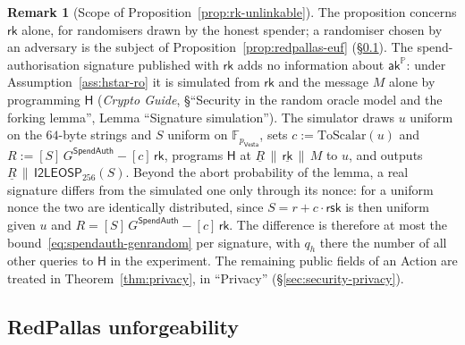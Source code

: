 \documentclass[11pt,a4paper]{article}
\theoremstyle{definition}
\newtheorem{remark}[theorem]{Remark}
\newcommand{\F}{\mathbb{F}}
\newcommand{\PP}{\mathbb{P}}
\newcommand{\rk}{\mathsf{rk}}
\newcommand{\Vesta}{\ensuremath{\mathsf{Vesta}}}
\newcommand{\aksym}{\ensuremath{\mathsf{ak}}}
\newcommand{\rsk}{\ensuremath{\mathsf{rsk}}}
\begin{document}
\begin{remark}[Scope of Proposition~\ref{prop:rk-unlinkable}]
The proposition concerns $\rk$ alone, for randomisers drawn by the honest
spender; a randomiser chosen by an adversary is the subject of
Proposition~\ref{prop:redpallas-euf} (\S\ref{sec:spendauth-euf}). The
spend-authorisation signature published with $\rk$ adds no information about
$\aksym^{\PP}$: under Assumption~\ref{ass:hstar-ro} it is simulated from
$\rk$ and the message $M$ alone by programming $\mathsf{H}$ (\emph{Crypto
Guide}, \S``Security in the random oracle model and the forking lemma'',
Lemma ``Signature simulation''). The simulator draws $u$ uniform on the
$64$-byte strings and $S$ uniform on $\F_{p_{\Vesta}}$, sets
$c := \mathrm{ToScalar}(u)$ and
$R := [S]\,G^{\mathsf{SpendAuth}} - [c]\,\rk$, programs $\mathsf{H}$ at
$\underline{R} \,\|\, \underline{\rk} \,\|\, M$ to $u$, and outputs
$\underline{R} \,\|\, \mathsf{I2LEOSP}_{256}(S)$. Beyond the abort
probability of the lemma, a real signature differs from the simulated one
only through its nonce: for a uniform nonce the two are identically
distributed, since $S = r + c \cdot \rsk$ is then uniform given $u$ and
$R = [S]\,G^{\mathsf{SpendAuth}} - [c]\,\rk$. The difference is therefore at
most the bound~\eqref{eq:spendauth-genrandom} per signature, with $q_h$ there
the number of all other queries to $\mathsf{H}$ in the experiment. The
remaining public fields of an Action are treated in
Theorem~\ref{thm:privacy}, in ``Privacy'' (\S\ref{sec:security-privacy}).
\end{remark}

\FloatBarrier
\subsection{RedPallas unforgeability}\label{sec:spendauth-euf}
\end{document}
